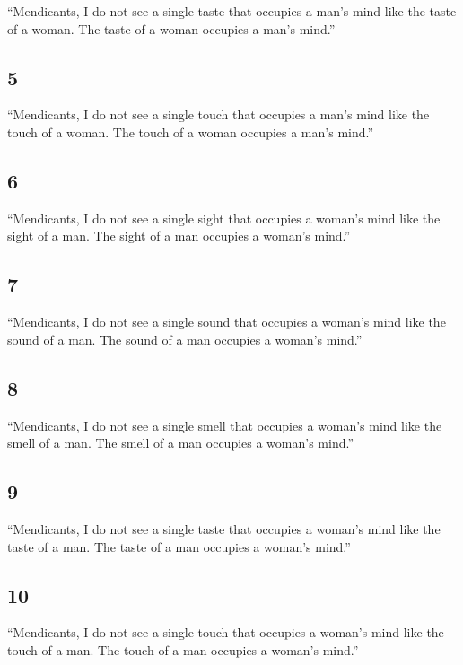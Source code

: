 \documentclass[12pt,openany]{book}%
\begin{document}
“Mendicants, I do not see a single taste that occupies a man’s mind like the taste of a woman. The taste of a woman occupies a man’s mind.” 

\subsection*{5 }

“Mendicants, I do not see a single touch that occupies a man’s mind like the touch of a woman. The touch of a woman occupies a man’s mind.” 

\subsection*{6 }

“Mendicants, I do not see a single sight that occupies a woman’s mind like the sight of a man. The sight of a man occupies a woman’s mind.” 

\subsection*{7 }

“Mendicants, I do not see a single sound that occupies a woman’s mind like the sound of a man. The sound of a man occupies a woman’s mind.” 

\subsection*{8 }

“Mendicants, I do not see a single smell that occupies a woman’s mind like the smell of a man. The smell of a man occupies a woman’s mind.” 

\subsection*{9 }

“Mendicants, I do not see a single taste that occupies a woman’s mind like the taste of a man. The taste of a man occupies a woman’s mind.” 

\subsection*{10 }

“Mendicants, I do not see a single touch that occupies a woman’s mind like the touch of a man. The touch of a man occupies a woman’s mind.” 
\end{document}
